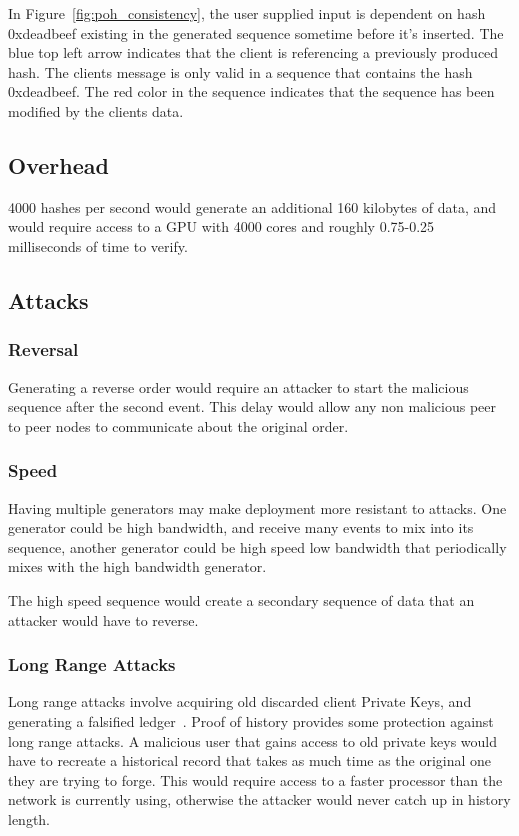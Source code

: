 \documentclass[12pt]{article}
\begin{document}
In Figure~\ref{fig:poh_consistency}, the user supplied input is dependent on hash 0xdeadbeef existing in the generated sequence sometime before it’s inserted.  The blue top left arrow indicates that the client is referencing a previously produced hash.  The clients message is only valid in a sequence that contains the hash 0xdeadbeef.  The red color in the sequence indicates that the sequence has been modified by the clients data.

\subsection{Overhead}
4000 hashes per second would generate an additional 160 kilobytes of data, and would require access to a GPU with 4000 cores and roughly 0.75-0.25 milliseconds of time to verify.

\subsection{Attacks}
\subsubsection{Reversal}
 Generating a reverse order would require an attacker to start the malicious sequence after the second event. This delay would allow any non malicious peer to peer nodes to communicate about the original order.

\subsubsection{Speed}
Having multiple generators may make deployment more resistant to attacks. One generator could be high bandwidth, and receive many events to mix into its sequence, another generator could be high speed low bandwidth that periodically mixes with the high bandwidth generator.

The high speed sequence would create a secondary sequence of data that an attacker would have to reverse.

\subsubsection{Long Range Attacks}

Long range attacks involve acquiring old discarded client Private Keys, and generating a falsified ledger~\cite{casper}.  Proof of history provides some protection against long range attacks. A malicious user that gains access to old private keys would have to recreate a historical record that takes as much time as the original one they are trying to forge. This would require access to a faster processor than the network is currently using, otherwise the attacker would never catch up in history length.
\end{document}

